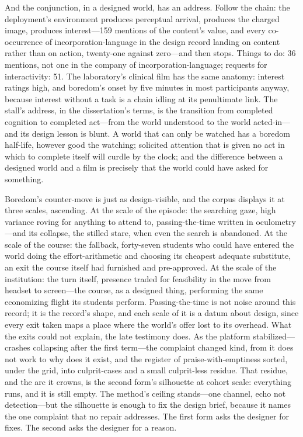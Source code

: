 And the conjunction, in a designed world, has an address. Follow the chain: the deployment's environment produces perceptual arrival, produces the charged image, produces interest---159 mentions of the content's value, and every co-occurrence of incorporation-language in the design record landing on content rather than on action, twenty-one against zero---and then stops. Things to do: 36 mentions, not one in the company of incorporation-language; requests for interactivity: 51. The laboratory's clinical film has the same anatomy: interest ratings high, and boredom's onset by five minutes in most participants anyway, because interest without a task is a chain idling at its penultimate link. The stall's address, in the dissertation's terms, is the transition from completed cognition to completed act---from the world understood to the world acted-in---and its design lesson is blunt. A world that can only be watched has a boredom half-life, however good the watching; solicited attention that is given no act in which to complete itself will curdle by the clock; and the difference between a designed world and a film is precisely that the world could have asked for something.

Boredom's counter-move is just as design-visible, and the corpus displays it at three scales, ascending. At the scale of the episode: the searching gaze, high variance roving for anything to attend to, passing-the-time written in oculometry---and its collapse, the stilled stare, when even the search is abandoned. At the scale of the course: the fallback, forty-seven students who could have entered the world doing the effort-arithmetic and choosing its cheapest adequate substitute, an exit the course itself had furnished and pre-approved. At the scale of the institution: the turn itself, presence traded for feasibility in the move from headset to screen---the course, as a designed thing, performing the same economizing flight its students perform. Passing-the-time is not noise around this record; it is the record's shape, and each scale of it is a datum about design, since every exit taken maps a place where the world's offer lost to its overhead. What the exits could not explain, the late testimony does. As the platform stabilized---crashes collapsing after the first term---the complaint changed kind, from it does not work to why does it exist, and the register of praise-with-emptiness sorted, under the grid, into culprit-cases and a small culprit-less residue. That residue, and the arc it crowns, is the second form's silhouette at cohort scale: everything runs, and it is still empty. The method's ceiling stands---one channel, echo not detection---but the silhouette is enough to fix the design brief, because it names the one complaint that no repair addresses. The first form asks the designer for fixes. The second asks the designer for a reason.


